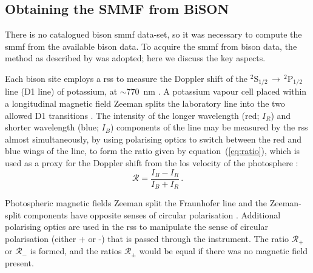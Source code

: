 \subsection{Obtaining the SMMF from BiSON}

There is no catalogued \gls{bison} \gls{smmf} data-set, so it was necessary to compute the \gls{smmf} from the available \gls{bison} data. To acquire the \gls{smmf} from \gls{bison} data, the method as described by \citet{chaplin_studies_2003} was adopted; here we discuss the key aspects.

Each \gls{bison} site employs a \gls{rss} to measure the Doppler shift of the $^{2}\mathrm{S}_{1/2} \, \rightarrow \, ^{2}\mathrm{P}_{1/2}$ line (D1 line) of potassium, at $\sim$770~nm \citep{brookes_resonant-scattering_1978}. A potassium vapour cell placed within a longitudinal magnetic field Zeeman splits the laboratory line into the two allowed D1 transitions \citep{lund_spatial_2017}. The intensity of the longer wavelength (red; $I_R$) and shorter wavelength (blue; $I_B$) components of the line may be measured by the \gls{rss} almost simultaneously, by using polarising optics to switch between the red and blue wings of the line, to form the ratio given by equation~(\ref{eq:ratio}), which is used as a proxy for the Doppler shift from the \gls{los} velocity of the photosphere \citep[see:][]{brookes_observation_1976, brookes_resonant-scattering_1978, elsworth_performance_1995, chaplin_studies_2003, lund_spatial_2017}: 
%
\begin{equation}
\mathcal{R} = \frac{I_B - I_R}{I_B + I_R} \, .
\label{eq:ratio}
\end{equation}


Photospheric magnetic fields Zeeman split the Fraunhofer line and the Zeeman-split components have opposite senses of circular polarisation \citep{chaplin_studies_2003}. Additional polarising optics are used in the \gls{rss} to manipulate the sense of circular polarisation (either + or -) that is passed through the instrument. The ratio $\mathcal{R}_{+}$ or $\mathcal{R}_{-}$ is formed, and the ratios $\mathcal{R}_{\pm}$ would be equal if there was no magnetic field present.

